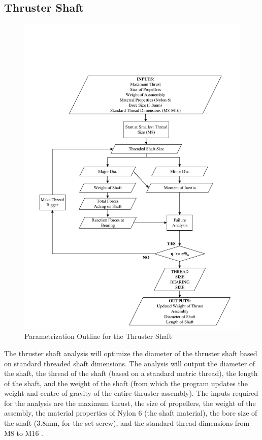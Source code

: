 \documentclass[../main.tex]{subfiles}
\begin{document}
\subsection{Thruster Shaft} \label{thrustShaft}

\begin{figure}[H]
	\centering
	\includegraphics[width=.9\linewidth]{img/paramaterization/thrusterShaft.pdf}
	\caption{Parametrization Outline for the Thruster Shaft}
	\label{fig:ThrusterShaftParametrization}
\end{figure}

The thruster shaft analysis will optimize the diameter of the thruster shaft based on standard threaded shaft dimensions. The analysis will output the diameter of the shaft, the thread of the shaft (based on a standard metric thread), the length of the shaft, and the weight of the shaft (from which the program updates the weight and centre of gravity of the entire thruster assembly). The inputs required for the analysis are the maximum thrust, the size of propellers, the weight of the assembly, the material properties of Nylon 6 \cite{Nylon6} (the shaft material), the bore size of the shaft  (3.8mm, for the set screw), and the standard thread dimensions from M8 to M16 \cite{threadSizes}.\\
\end{document}
